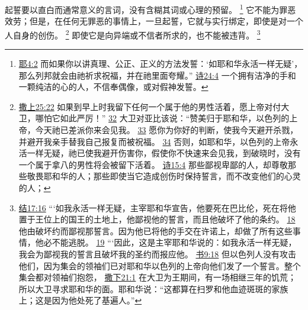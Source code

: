 \documentclass[12pt, a4paper, oneside]{ctexart}
\newcounter{parnum}[section]
\newcommand{\N}{%
   \noindent\refstepcounter{parnum}%
    \makebox[\parindent][l]{\textbf{\arabic{parnum}.}}}
\begin{document}
\N 起誓要以直白而通常意义的言词，没有含糊其词或心理的预留。
	\footnote {
		\href{https://biblehub.com/jeremiah/4-2.htm}{耶4:2} 而如果你以讲真理、公正、正义的方法发誓：‘如耶和华永活一样无疑’，那么列邦就会由祂祈求祝福，并在祂里面夸耀。”
		\href{https://biblehub.com/psalms/24-4.htm}{诗24:4} 一个拥有洁净的手和一颗纯洁的心的人，不信奉偶像，或对假神发誓。
	}
	它不能为罪恶效劳；但是，在任何无罪恶的事情上，一旦起誓，它就与实行绑定，即使是对一个人自身的创伤。
	\footnote {
		\href{https://biblehub.com/1_samuel/25-22.htm}{撒上25:22} 如果到早上时我留下任何一个属于他的男性活着，愿上帝对付大卫，哪怕它如此严厉！”
		\href{https://biblehub.com/1_samuel/25-32.htm}{32} 大卫对亚比该说：“赞美归于耶和华，以色列的上帝，今天祂已差派你来会见我。
		\href{https://biblehub.com/1_samuel/25-33.htm}{33} 愿你为你好的判断，使我今天避开杀戮，并避开我亲手替我自己报复而被祝福。
		\href{https://biblehub.com/1_samuel/25-34.htm}{34} 否则，如耶和华，以色列的上帝永活一样无疑，祂已使我避开伤害你，假使你不快速来会见我，到破晓时，没有一个属于拿八的男性将会被留下活着。
		\href{https://biblehub.com/psalms/15-4.htm}{诗15:4} 那些鄙视卑鄙的人，却尊敬那些敬畏耶和华的人；那些即使当它造成创伤时保持誓言，而不改变他们的心灵的人；
	}
	即使它是向异端或不信者所求的，也不能被违背。
	\footnote {
		\href{https://biblehub.com/ezekiel/17-16.htm}{结17:16} “‘如我永活一样无疑，主宰耶和华宣告，他要死在巴比伦，死在将他置于王位上的国王的土地上，他鄙视他的誓言，而且他破坏了他的条约。
		\href{https://biblehub.com/ezekiel/17-18.htm}{18} 他由破坏约而鄙视那誓言。因为他已将他的手交在许诺上，却做了所有这些事情，他必不能逃脱。
		\href{https://biblehub.com/ezekiel/17-19.htm}{19} “‘因此，这是主宰耶和华说的：如我永活一样无疑，我会为鄙视我的誓言且破坏我的圣约而报应他。
		\href{https://biblehub.com/joshua/9-18.htm}{书9:18} 但以色列人没有攻击他们，因为集会的领袖们已对耶和华以色列的上帝向他们发了一个誓言。整个集会都对领袖们抱怨，
		\href{https://biblehub.com/2_samuel/21-1.htm}{撒下21:1} 在大卫为王期间，有一场相继三年的饥荒；所以大卫寻求耶和华的面。耶和华说：“这都算在扫罗和他血迹斑斑的家族上；这是因为他处死了基遍人。”
	}
\end{document}

